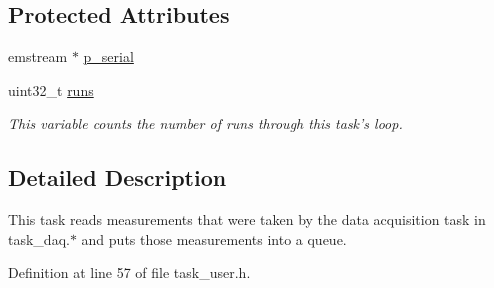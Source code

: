 \subsection*{Protected Attributes}
\begin{DoxyCompactItemize}
\item 
emstream $\ast$ \hyperlink{classtask__user_a04ed5c2b4d7c9a1530bde6f217e01681}{p\+\_\+serial}
\item 
\hypertarget{classtask__user_ac85973422902084fc9a4692250be32fe}{uint32\+\_\+t \hyperlink{classtask__user_ac85973422902084fc9a4692250be32fe}{runs}}\label{classtask__user_ac85973422902084fc9a4692250be32fe}

\begin{DoxyCompactList}\small\item\em This variable counts the number of runs through this task's loop. \end{DoxyCompactList}\end{DoxyCompactItemize}


\subsection{Detailed Description}
This task reads measurements that were taken by the data acquisition task in task\+\_\+daq.$\ast$ and puts those measurements into a queue. 

Definition at line 57 of file task\+\_\+user.\+h.



